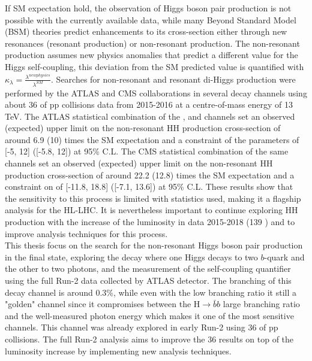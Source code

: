 If SM expectation hold, the observation of Higgs boson pair production is not possible with the currently available data, while many Beyond Standard Model (BSM) theories predict enhancements to its cross-section either through new resonances (resonant production) or non-resonant production. The non-resonant production assumes new physics anomalies that predict a different value for the Higgs self-coupling, this deviation from the SM predicted value is quantified with $\kappa_{\lambda} = \frac{\lambda^{new physics}}{\lambda^{SM}}$. Searches for non-resonant and resonant di-Higgs production were performed by the ATLAS and CMS collaborations in several decay channels using about 36 \ifb of pp collisions data from 2015-2016 at a centre-of-mass energy of 13 TeV. The ATLAS statistical combination of the \bbbb, \bbtt and \bbyy channels set an observed (expected) upper limit on the non-resonant HH production cross-section of around 6.9 (10) times the SM expectation and a constraint of the \kl parameters of [-5, 12] ([-5.8, 12]) at 95\% C.L. The CMS statistical combination of the same channels set an observed (expected) upper limit on the non-resonant HH production cross-section of around 22.2 (12.8) times the SM expectation and a constraint on \kl of [-11.8, 18.8] ([-7.1, 13.6]) at 95\% C.L. These results show that the sensitivity to this process is limited with statistics used, making it a flagship analysis for the HL-LHC. It is nevertheless important to continue exploring HH production with the increase of the luminosity in data 2015-2018 (139 \ifb) and to improve analysis techniques for this process. \\

This thesis focus on the search for the non-resonant Higgs boson pair production in the \bbyy final state, exploring the decay where one Higgs decays to two $b$-quark and the other to two photons, and the measurement of the self-coupling quantifier \kl using the full Run-2 data collected by ATLAS detector. The branching of this decay channel is around 0.3\%, while even with the low branching ratio it still a "golden" channel since it compromises between the H$\to\bar{b}b$ large branching ratio and the well-measured photon energy which makes it one of the most sensitive channels. This channel was already explored in early Run-2 using 36 \ifb of pp collisions. The full Run-2 analysis aims to improve the 36 \ifb results on top of the luminosity increase by implementing new analysis techniques.

